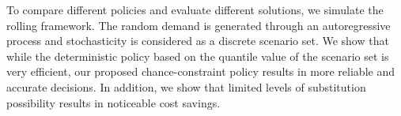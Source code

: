 \documentclass[11pt]{article}
\begin{document}
To compare different policies and evaluate different solutions, we simulate the rolling framework. The random demand is generated through an autoregressive process and stochasticity is considered as a discrete scenario set. We show that while the deterministic policy based on the quantile value of the scenario set is very efficient, our proposed chance-constraint policy results in more reliable and accurate decisions. In addition, we show that limited levels of substitution possibility results in noticeable cost savings.

\end{document}
